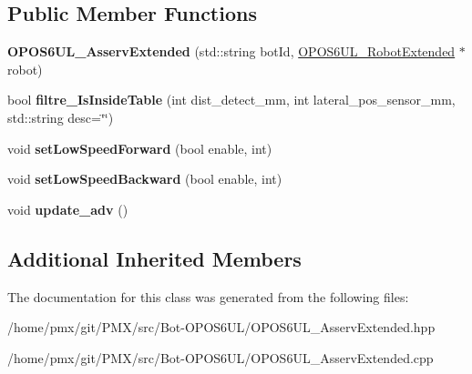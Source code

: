 \subsection*{Public Member Functions}
\begin{DoxyCompactItemize}
\item 
\mbox{\label{classOPOS6UL__AsservExtended_a3cbb1be6cb65b19bf65e96dab20b74af}} 
{\bfseries O\+P\+O\+S6\+U\+L\+\_\+\+Asserv\+Extended} (std\+::string bot\+Id, \hyperlink{classOPOS6UL__RobotExtended}{O\+P\+O\+S6\+U\+L\+\_\+\+Robot\+Extended} $\ast$robot)
\item 
\mbox{\label{classOPOS6UL__AsservExtended_a4e96d47def0637c3f6e135a0a3ee3d1c}} 
bool {\bfseries filtre\+\_\+\+Is\+Inside\+Table} (int dist\+\_\+detect\+\_\+mm, int lateral\+\_\+pos\+\_\+sensor\+\_\+mm, std\+::string desc=\char`\"{}\char`\"{})
\item 
\mbox{\label{classOPOS6UL__AsservExtended_a4051050e404d0f6d003ad65135b585f5}} 
void {\bfseries set\+Low\+Speed\+Forward} (bool enable, int)
\item 
\mbox{\label{classOPOS6UL__AsservExtended_a8393038f501bbaf3998cd43e99cf11b2}} 
void {\bfseries set\+Low\+Speed\+Backward} (bool enable, int)
\item 
\mbox{\label{classOPOS6UL__AsservExtended_a07ee980d1e3fbac4dcecc2b5754bed44}} 
void {\bfseries update\+\_\+adv} ()
\end{DoxyCompactItemize}
\subsection*{Additional Inherited Members}


The documentation for this class was generated from the following files\+:\begin{DoxyCompactItemize}
\item 
/home/pmx/git/\+P\+M\+X/src/\+Bot-\/\+O\+P\+O\+S6\+U\+L/O\+P\+O\+S6\+U\+L\+\_\+\+Asserv\+Extended.\+hpp\item 
/home/pmx/git/\+P\+M\+X/src/\+Bot-\/\+O\+P\+O\+S6\+U\+L/O\+P\+O\+S6\+U\+L\+\_\+\+Asserv\+Extended.\+cpp\end{DoxyCompactItemize}
